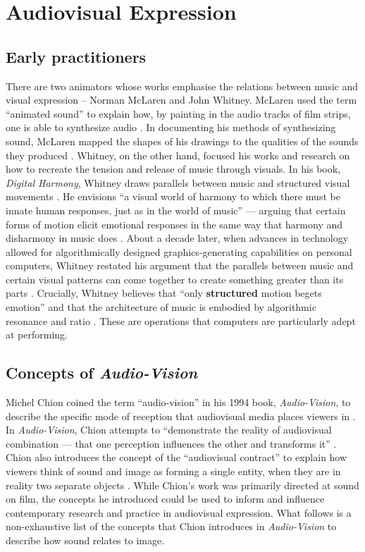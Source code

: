 \documentclass[../initial_thesis.tex]{subfiles}
\begin{document}
\section{Audiovisual Expression}
\subsection{Early practitioners}
There are two animators whose works emphasise the relations between music and visual expression -- Norman McLaren and John Whitney. McLaren used the term ``animated sound'' to explain how, by painting in the audio tracks of film strips, one is able to synthesize audio \cite{McLaren1953}. In documenting his methods of synthesizing sound, McLaren mapped the shapes of his drawings to the qualities of the sounds they produced \cite{McLaren1953}. Whitney, on the other hand, focused his works and research on how to recreate the tension and release of music through visuals. In his book, \textit{Digital Harmony}, Whitney draws parallels between music and structured visual movements \cite{Whitney1980}. He envisions ``a visual world of harmony to which there must be innate human responses, just as in the world of music'' --- arguing that certain forms of motion elicit emotional responses in the same way that harmony and disharmony in music does \cite{Whitney1980}. About a decade later, when advances in technology allowed for algorithmically designed graphics-generating capabilities on personal computers, Whitney restated his argument that the parallels between music and certain visual patterns can come together to create something greater than its parts \cite{Whitney1991}. Crucially, Whitney believes that ``only \textbf{structured} motion begets emotion'' \cite{Whitney1980} and that the architecture of music is embodied by algorithmic resonance and ratio \cite{Whitney1991}. These are operations that computers are particularly adept at performing. \par

\subsection{Concepts of \textit{Audio-Vision}}
Michel Chion coined the term ``audio-vision'' in his 1994 book, \textit{Audio-Vision}, to describe the specific mode of reception that audiovisual media places viewers in \cite{Chion1994}. In \textit{Audio-Vision}, Chion attempts to ``demonstrate the reality of audiovisual combination --- that one perception influences the other and transforms it'' \cite{Chion1994}. Chion also introduces the concept of the ``audiovisual contract'' to explain how viewers think of sound and image as forming a single entity, when they are in reality two separate objects \cite{Chion1994}. While Chion's work was primarily directed at sound on film, the concepts he introduced could be used to inform and influence contemporary research and practice in audiovisual expression.
What follows is a non-exhaustive list of the concepts that Chion introduces in \textit{Audio-Vision} to describe how sound relates to image.
\end{document}
